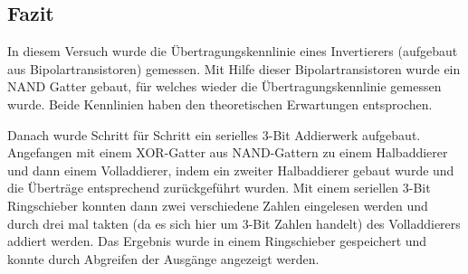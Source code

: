 \documentclass[10pt]{article}
\begin{document}
\begin{multicols}{2}
	\section{Fazit}
	In diesem Versuch wurde die Übertragungskennlinie eines Invertierers (aufgebaut aus Bipolartransistoren) gemessen.
	Mit Hilfe dieser Bipolartransistoren wurde ein NAND Gatter gebaut, für welches wieder die Übertragungskennlinie gemessen wurde.
	Beide Kennlinien haben den theoretischen Erwartungen entsprochen.
	\par Danach wurde Schritt für Schritt ein serielles 3-Bit Addierwerk aufgebaut.
	Angefangen mit einem XOR-Gatter aus NAND-Gattern zu einem Halbaddierer und dann einem Volladdierer, indem ein zweiter Halbaddierer gebaut wurde und die Überträge entsprechend zurückgeführt wurden.
	Mit einem seriellen 3-Bit Ringschieber konnten dann zwei verschiedene Zahlen eingelesen werden und durch drei mal takten (da es sich hier um 3-Bit Zahlen handelt) des Volladdierers addiert werden.
	Das Ergebnis wurde in einem Ringschieber gespeichert und konnte durch Abgreifen der Ausgänge angezeigt werden.


\end{multicols}
\end{document}
